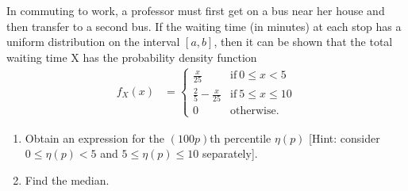 \documentclass[10pt]{article}
\newenvironment{problem}[2][Problem]{\begin{trivlist}
\item[\hskip \labelsep {\bfseries #1}\hskip \labelsep {\bfseries #2.}]}{\end{trivlist}}
\begin{document}
%

\begin{problem}{4}
In commuting to work, a professor must first get on a bus near her house and then transfer to a second bus. If the waiting time (in minutes) at each stop has a uniform distribution on the interval $[a,b]$, then it can be shown that the total waiting time X has the probability density function
\begin{align*}
    f_X(x) &= 
    \begin{cases}
      \frac{x}{25} & \text{if}\ 0 \leq x < 5 \\
      \frac{2}{5} -\frac{x}{25} & \text{if}\ 5 \leq x \leq 10 \\
      0 & \text{otherwise.}
    \end{cases}
\end{align*}
\begin{enumerate}[label=(\alph*)]
\item Obtain an expression for the $(100p)$th percentile $\eta(p)$ [Hint: consider $0 \leq \eta(p) < 5$ and $5 \leq \eta(p) \leq 10$ separately].
\item Find the median.
\end{enumerate}
\end{problem}
\end{document}
